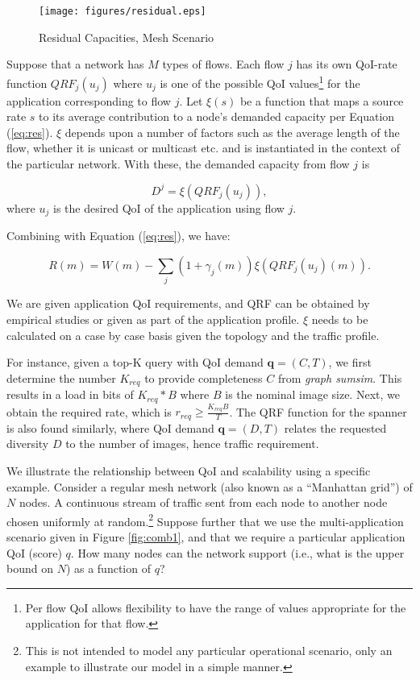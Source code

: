 \begin{figure}
\begin{centering}
    \texttt{[image: figures/residual.eps]}
    \caption{Residual Capacities, Mesh Scenario}
    \label{resf}
\end{centering}
\end{figure}

Suppose that a network has $M$ types of flows. Each flow $j$ has its own
QoI-rate function $QRF_j(u_j)$ where $u_j$ is one of the possible QoI
values\footnote{Per flow QoI allows flexibility to have the range of
values appropriate for the application for that flow.}
for the application corresponding to flow $j$. Let $\xi(s)$ be a function that
maps a source rate $s$ to its average contribution to a node's demanded
capacity per Equation (\ref{eq:res}).
$\xi$ depends upon a number of factors such as the
average length of the flow, whether it is unicast or multicast etc. and
is instantiated in the context of the particular network.
With these, the demanded capacity from flow $j$ is

\begin{equation}
D^j = \xi(QRF_j(u_j)),
\end{equation}
where $u_j$ is the desired QoI of the application using flow $j$.

Combining with Equation (\ref{eq:res}), we have:

\begin{equation}
R(m) = W(m) - \sum_j (1+\gamma_j(m))\xi(QRF_j(u_j)(m))   \label{eq:utility}.
\end{equation}

We are given application QoI requirements, and QRF can be obtained by
empirical studies or given as part of the application profile.
$\xi$ needs to be calculated on a case by case basis
given the topology and the traffic profile.

For instance, given a top-K query with QoI demand $\textbf{q}=(C,T)$, we first determine the number $K_{req}$ to provide completeness $C$ from \emph{graph sumsim}. This results in a load in bits of $K_{req}*B$ where $B$ is the nominal image size.  Next, we obtain the required rate, which is $r_{req}\geq \frac{K_{req}B}{T}$. The QRF function for the spanner is also found similarly, where QoI demand $\textbf{q}=(D,T)$ relates the requested diversity $D$ to the number of images, hence traffic requirement.


We illustrate the relationship between QoI and scalability using a
 specific example.  Consider a
regular mesh network (also known as a ``Manhattan grid'') of $N$ nodes.
A continuous stream of traffic sent from each node to another node chosen
uniformly at random.\footnote{This is not
intended to model any particular operational scenario, only an
example to illustrate our model in a simple manner.}  Suppose
further that we use the multi-application scenario given in Figure
\ref{fig:comb1}, and that we
require a particular application QoI (score) $q$.  How
many nodes can the network support (i.e., what is the upper bound on
$N$) as a function of $q$?

